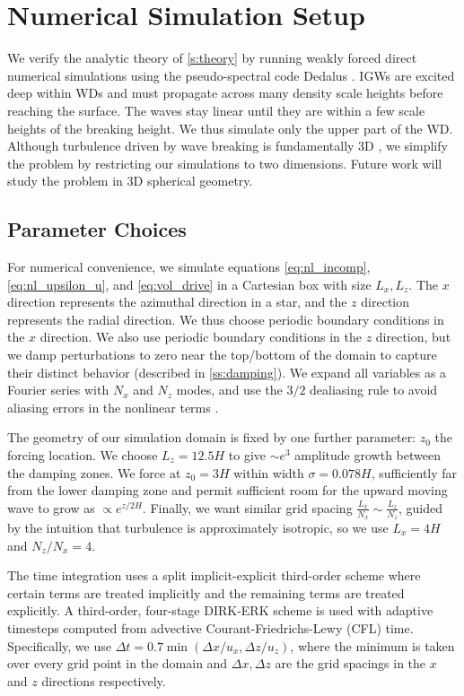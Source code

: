 \documentclass[
        fleqn,
        usenatbib,
    ]{mnras}
\begin{document}
\section{Numerical Simulation Setup}\label{ss:numerics}

We verify the analytic theory of \autoref{s:theory} by running weakly forced
direct numerical simulations using the pseudo-spectral code Dedalus
\citep{dedalus,dedalus2}. IGWs are excited deep within WDs and must propagate
across many density scale heights before reaching the surface. The waves stay
linear until they are within a few scale heights of the breaking height. We thus
simulate only the upper part of the WD\@. Although turbulence driven by wave
breaking is fundamentally 3D \citep{klostermeyer}, we simplify the problem by
restricting our simulations to two dimensions. Future work will study the
problem in 3D spherical geometry.

\subsection{Parameter Choices}

For numerical convenience, we simulate equations \autoref{eq:nl_incomp},
\autoref{eq:nl_upsilon_u}, and \autoref{eq:vol_drive} in a Cartesian box with
size $L_x, L_z$. The $x$ direction represents the azimuthal direction in a star,
and the $z$ direction represents the radial direction. We thus choose periodic
boundary conditions in the $x$ direction. We also use periodic boundary
conditions in the $z$ direction, but we damp perturbations to zero near the
top/bottom of the domain to capture their distinct behavior (described in
\autoref{ss:damping}). We expand all variables as a Fourier series with $N_x$
and $N_z$ modes, and use the $3/2$ dealiasing rule to avoid aliasing errors in
the nonlinear terms \citep{boyd}.

The geometry of our simulation domain is fixed by one further parameter: $z_0$
the forcing location. We choose $L_z = 12.5H$ to give $\sim e^3$ amplitude growth
between the damping zones. We force at $z_0 = 3H$ within width $\sigma =
0.078H$, sufficiently far from the lower damping zone and permit sufficient room
for the upward moving wave to grow as $\propto e^{z/2H}$. Finally, we want
similar grid spacing $\frac{L_x}{N_x} \sim \frac{L_z}{N_z}$, guided by the
intuition that turbulence is approximately isotropic, so we use $L_x = 4H$ and
$N_z / N_x = 4$.

The time integration uses a split implicit-explicit third-order scheme where
certain terms are treated implicitly and the remaining terms are treated
explicitly. A third-order, four-stage DIRK-ERK scheme \citep{ascher} is used
with adaptive timesteps computed from advective Courant-Friedrichs-Lewy (CFL)
time. Specifically, we use $\Delta t = 0.7 \min(\Delta x / u_x,\Delta z /
u_{z})$, where the minimum is taken over every grid point in the domain and
$\Delta x,\Delta z$ are the grid spacings in the $x$ and $z$ directions
respectively.
\end{document}
